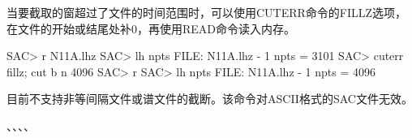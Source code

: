当要截取的窗超过了文件的时间范围时，可以使用CUTERR命令的FILLZ选项，
在文件的开始或结尾处补0，再使用READ命令读入内存。
\begin{SACCode}
SAC> r N11A.lhz
SAC> lh npts
FILE: N11A.lhz - 1
npts = 3101
SAC> cuterr fillz; cut b n 4096
SAC> r
SAC> lh npts
FILE: N11A.lhz - 1
npts = 4096
\end{SACCode}

目前不支持非等间隔文件或谱文件的截断。该命令对ASCII格式的SAC文件无效。

、、、、
